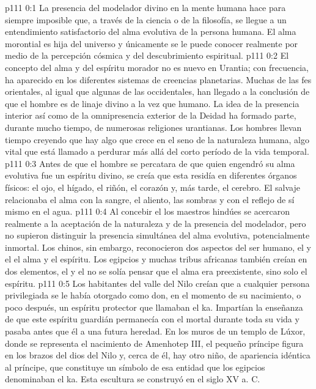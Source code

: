 \author{Mensajero solitario}
\vs p111 0:1 La presencia del modelador divino en la mente humana hace para siempre imposible que, a través de la ciencia o de la filosofía, se llegue a un entendimiento satisfactorio del alma evolutiva de la persona humana. El alma morontial es hija del universo y únicamente se le puede conocer realmente por medio de la percepción cósmica y del descubrimiento espiritual.
\vs p111 0:2 \pc El concepto del alma y del espíritu morador no es nuevo en Urantia; con frecuencia, ha aparecido en los diferentes sistemas de creencias planetarias. Muchas de las fes orientales, al igual que algunas de las occidentales, han llegado a la conclusión de que el hombre es de linaje divino a la vez que humano. La idea de la presencia interior así como de la omnipresencia exterior de la Deidad ha formado parte, durante mucho tiempo, de numerosas religiones urantianas. Los hombres llevan tiempo creyendo que hay algo que crece en el seno de la naturaleza humana, algo vital que está llamado a perdurar más allá del corto período de la vida temporal.
\vs p111 0:3 Antes de que el hombre se percatara de que quien engendró su alma evolutiva fue un espíritu divino, se creía que esta residía en diferentes órganos físicos: el ojo, el hígado, el riñón, el corazón y, más tarde, el cerebro. El salvaje relacionaba el alma con la sangre, el aliento, las sombras y con el reflejo de sí mismo en el agua.
\vs p111 0:4 Al concebir el  los maestros hindúes se acercaron realmente a la aceptación de la naturaleza y de la presencia del modelador, pero no supieron distinguir la presencia simultánea del alma evolutiva, potencialmente inmortal. Los chinos, sin embargo, reconocieron dos aspectos del ser humano, el  y el  el alma y el espíritu. Los egipcios y muchas tribus africanas también creían en dos elementos, el  y el  no se solía pensar que el alma era preexistente, sino solo el espíritu.
\vs p111 0:5 Los habitantes del valle del Nilo creían que a cualquier persona privilegiada se le había otorgado como don, en el momento de su nacimiento, o poco después, un espíritu protector que llamaban el ka. Impartían la enseñanza de que este espíritu guardián permanecía con el mortal durante toda su vida y pasaba antes que él a una futura heredad. En los muros de un templo de Lúxor, donde se representa el nacimiento de Amenhotep III, el pequeño príncipe figura en los brazos del dios del Nilo y, cerca de él, hay otro niño, de apariencia idéntica al príncipe, que constituye un símbolo de esa entidad que los egipcios denominaban el ka. Esta escultura se construyó en el siglo XV a. C.
